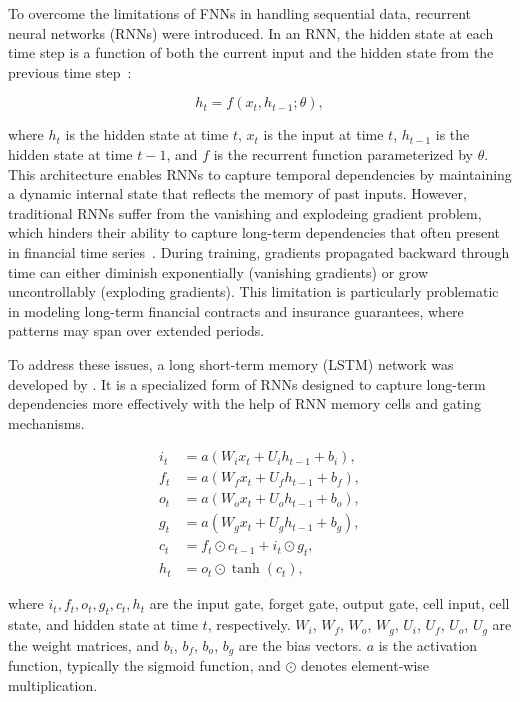 To overcome the limitations of FNNs in handling sequential data, recurrent neural networks (RNNs) were introduced.
In an RNN, the hidden state at each time step is a function of both the current input and the hidden state from the previous time step~\citep{elman1990finding}:

\begin{equation}
    h_t = f(x_t, h_{t-1}; \theta),
\end{equation}

where $h_t$ is the hidden state at time $t$, $x_t$ is the input at time $t$, $h_{t-1}$ is the hidden state at time $t-1$, and $f$ is the recurrent function parameterized by $\theta$.
This architecture enables RNNs to capture temporal dependencies by maintaining a dynamic internal state that reflects the memory of past inputs.
However, traditional RNNs suffer from the vanishing and explodeing gradient problem, which hinders their ability to capture long-term dependencies that often present in financial time series~\citep{bengio1994learning}.
During training, gradients propagated backward through time can either diminish exponentially (vanishing gradients) or grow uncontrollably (exploding gradients).
This limitation is particularly problematic in modeling long-term financial contracts and insurance guarantees, where patterns may span over extended periods.

To address these issues, a long short-term memory (LSTM) network was developed by \citet{hochreiter1997long}.
It is a specialized form of RNNs designed to capture long-term dependencies more effectively with the help of RNN memory cells and gating mechanisms.

\begin{align*}
    i_t &= a(W_i x_t + U_i h_{t-1} + b_i), \\
    f_t &= a(W_f x_t + U_f h_{t-1} + b_f), \\
    o_t &= a(W_o x_t + U_o h_{t-1} + b_o), \\
    g_t &= a(W_g x_t + U_g h_{t-1} + b_g), \\
    c_t &= f_t \odot c_{t-1} + i_t \odot g_t, \\
    h_t &= o_t \odot \tanh(c_t),
\end{align*}

where $i_t, f_t, o_t, g_t, c_t, h_t$ are the input gate, forget gate, output gate, cell input, cell state, and hidden state at time $t$, respectively.
$W_i$, $W_f$, $W_o$, $W_g$, $U_i$, $U_f$, $U_o$, $U_g$ are the weight matrices, and $b_i$, $b_f$, $b_o$, $b_g$ are the bias vectors.
$a$ is the activation function, typically the sigmoid function, and $\odot$ denotes element-wise multiplication.

